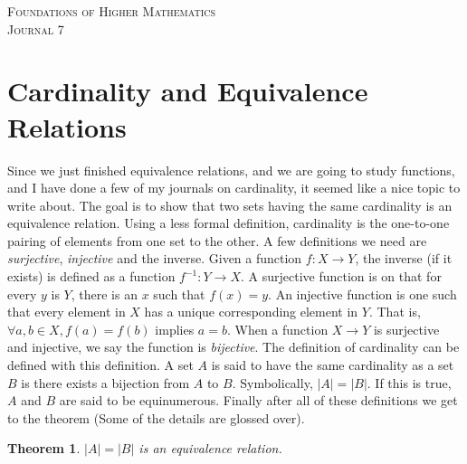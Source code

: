 \documentclass{article}
\newtheorem*{thm}{Theorem}
\begin{document}

\begin{center}
\textsc{\Large Foundations of Higher Mathematics}\\[.3cm]
\textsc{\Large Journal 7}\\[1cm]
\end{center}


\section*{Cardinality and Equivalence Relations}
Since we just finished equivalence relations, and we are going to study functions, and I have done a few of my journals on cardinality, it seemed like a nice topic to write about. The goal is to show that two sets having the same cardinality is an equivalence relation. Using a less formal definition, cardinality is the one-to-one pairing of elements from one set to the other. A few definitions we need are \textit{surjective}, \textit{injective} and the inverse. Given a function $f : X \to Y$, the inverse (if it exists) is defined as a function $f^{-1} : Y \to X$. A surjective function is on that for every $y$ is $Y$, there is an $x$ such that $f(x) = y$. An injective function is one such that every element in $X$ has a unique corresponding element in $Y$. That is, $\forall a,b \in X, f(a) = f(b)$ implies $a = b$. When a function $X \to Y$ is surjective and injective, we say the function is \textit{bijective}. The definition of cardinality can be defined with this definition. A set $A$ is said to have the same cardinality as a set $B$ is there exists a bijection from $A$ to $B$. Symbolically, $|A| = |B|$. If this is true, $A$ and $B$ are said to be equinumerous. Finally after all of these definitions we get to the theorem (Some of the details are glossed over).
\begin{thm}
  $|A| = |B|$ is an equivalence relation.
\end{thm}
\end{document}
